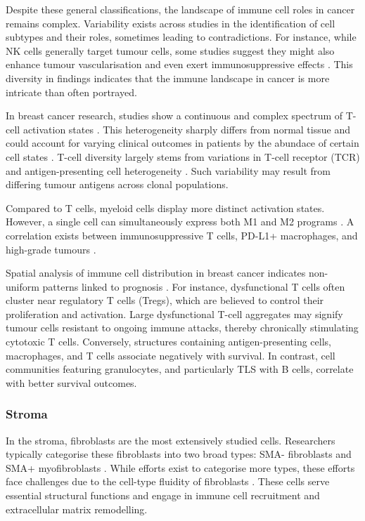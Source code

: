 Despite these general classifications, the landscape of immune cell roles in cancer remains complex. Variability exists across studies in the identification of cell subtypes and their roles, sometimes leading to contradictions. For instance, while NK cells generally target tumour cells, some studies suggest they might also enhance tumour vascularisation and even exert immunosuppressive effects \parencite{Retecki2021-se}. This diversity in findings indicates that the immune landscape in cancer is more intricate than often portrayed.

In breast cancer research, studies show a continuous and complex spectrum of T-cell activation states \parencite{Azizi2018-vc}. This heterogeneity sharply differs from normal tissue and could account for varying clinical outcomes in patients by the abundace of certain cell states \parencite{Azizi2018-vc,Savas2018-vb}. T-cell diversity largely stems from variations in T-cell receptor (TCR) and antigen-presenting cell heterogeneity \parencite{Azizi2018-vc}. Such variability may result from differing tumour antigens across clonal populations.

Compared to T cells, myeloid cells display more distinct activation states. However, a single cell can simultaneously express both M1 and M2 programs \parencite{Azizi2018-vc}. A correlation exists between immunosuppressive T cells, PD-L1+ macrophages, and high-grade tumours \parencite{Wagner2019-zp}.

Spatial analysis of immune cell distribution in breast cancer indicates non-uniform patterns linked to prognosis \parencite{Danenberg2022-zb, Wang2023-bo}. For instance, dysfunctional T cells often cluster near regulatory T cells (Tregs), which are believed to control their proliferation and activation. Large dysfunctional T-cell aggregates may signify tumour cells resistant to ongoing immune attacks, thereby chronically stimulating cytotoxic T cells. Conversely, structures containing antigen-presenting cells, macrophages, and T cells associate negatively with survival. In contrast, cell communities featuring granulocytes, and particularly \acf{TLS} with B cells, correlate with better survival outcomes.

\subsubsection*{Stroma}

In the stroma, fibroblasts are the most extensively studied cells. Researchers typically categorise these fibroblasts into two broad types: SMA- fibroblasts and SMA+ myofibroblasts \parencite{Costa2018-ir}. While efforts exist to categorise more types, these efforts face challenges due to the cell-type fluidity of fibroblasts \parencite{Cords2023-og,Wu2021-uq}. These cells serve essential structural functions and engage in immune cell recruitment and extracellular matrix remodelling.

